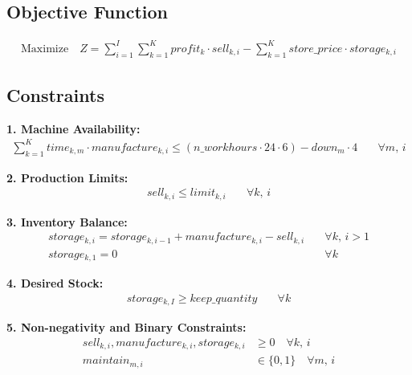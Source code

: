 \documentclass{article}
\begin{document}
\subsection*{Objective Function}
\begin{align*}
    \text{Maximize} \quad Z = \sum_{i=1}^{I} \sum_{k=1}^{K} profit_{k} \cdot sell_{k,i} - \sum_{k=1}^{K} store\_price \cdot storage_{k,i}
\end{align*}

\subsection*{Constraints}

\textbf{1. Machine Availability:}
\begin{align*}
    \sum_{k=1}^{K} time_{k,m} \cdot manufacture_{k,i} \leq (n\_workhours \cdot 24 \cdot 6) - down_{m} \cdot 4 & \quad \forall m, \, i
\end{align*}

\textbf{2. Production Limits:}
\begin{align*}
    sell_{k,i} \leq limit_{k,i} & \quad \forall k, \, i
\end{align*}

\textbf{3. Inventory Balance:}
\begin{align*}
    storage_{k,i} = storage_{k,i-1} + manufacture_{k,i} - sell_{k,i} & \quad \forall k, \, i > 1 \\
    storage_{k,1} = 0 & \quad \forall k
\end{align*}

\textbf{4. Desired Stock:}
\begin{align*}
    storage_{k,I} \geq keep\_quantity & \quad \forall k
\end{align*}

\textbf{5. Non-negativity and Binary Constraints:}
\begin{align*}
    sell_{k,i}, manufacture_{k,i}, storage_{k,i} & \geq 0 \quad \forall k, \, i \\
    maintain_{m,i} & \in \{0, 1\} \quad \forall m, \, i
\end{align*}
\end{document}
